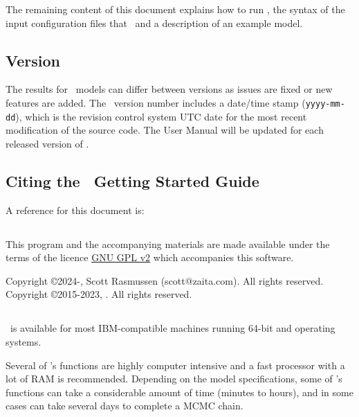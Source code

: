 The remaining content of this document explains how to run \CNAME, the syntax of the input configuration files that \CNAME\, and a description of an example model.

\subsection{Version\label{sec:version}}

The results for \CNAME\ models can differ between versions as issues are fixed or new features are added. The \CNAME\ version number includes a date/time stamp (\texttt{yyyy-mm-dd}), which is the revision control system UTC date for the most recent modification of the source code. The User Manual will be updated for each released version of \CNAME.

\subsection{Citing the \CNAME\ Getting Started Guide}

A reference for this document is: 

\ManualRef{}
 
\subsection{}

This program and the accompanying materials are made available under the terms of the licence \href{http://www.gnu.org/licenses/old-licenses/gpl-2.0.en.html}{GNU GPL v2} which accompanies this software.

Copyright \copyright 2024-, Scott Rasmussen (scott@zaita.com). All rights reserved.
Copyright \copyright 2015-2023, \href{http://www.niwa.co.nz}{\Organisation}. All rights reserved.

\subsection{}

\CNAME\ is available for most IBM-compatible machines running 64-bit  and  operating systems.

Several of \CNAME's functions are highly computer intensive and a fast processor with a lot of RAM is recommended. Depending on the model specifications, some of \CNAME's functions can take a considerable amount of time (minutes to hours), and in some cases can take several days to complete a MCMC chain.

